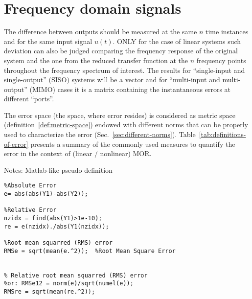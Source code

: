 \documentclass[10pt,oneside]{article}
\begin{document}
\par \pagebreak

\section{Frequency domain signals}
The difference between outputs should be measured at the same $n$ time instances and for the same input signal $u(t)$. ONLY for the case of linear systems such deviation can also be judged comparing the frequency response of the original system and the one from the reduced transfer function at the $n$ frequency points throughout the frequency spectrum of interest.
The results for ``single-input and single-output'' (SISO) systems will be a vector and  for ``multi-input and multi-output'' (MIMO) cases it is a matrix containing the instantaneous errors at different ``ports''.

The error space (the space, where error resides) is considered as metric space (definition~\ref{def:metric-space}) endowed with different norms that can be properly used to characterize the error (Sec.~\ref{sec:different-norms}). Table~\ref{tab:definitions-of-error} presents a summary of the commonly used measures to quantify the error in the context of (linear / nonlinear) MOR.



Notes: Matlab-like pseudo definition
\begin{lstlisting}
%Absolute Error
e= abs(abs(Y1)-abs(Y2));

%Relative Error
nzidx = find(abs(Y1)>1e-10);
re = e(nzidx)./abs(Y1(nzidx)); 

%Root mean squarred (RMS) error
RMSe = sqrt(mean(e.^2));  %Root Mean Square Error   


% Relative root mean squarred (RMS) error
%or: RMSe12 = norm(e)/sqrt(numel(e));
RMSre = sqrt(mean(re.^2)); 
    
\end{lstlisting}

%
%
\end{document}

